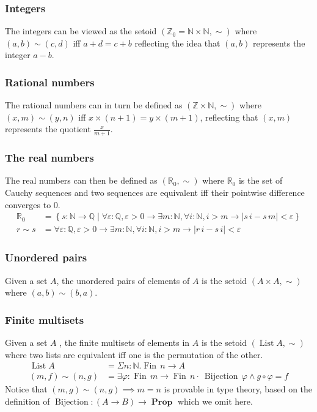 \documentclass[envcountsame]{llncs}
\newcommand{\N}{\mathbb{N}}
\newcommand{\Q}{\mathbb{Q}}
\newcommand{\R}{\mathbb{R}}
\newcommand{\Z}{\mathbb{Z}}
\providecommand{\set}  [1]{\left\{#1\right\}}
\DeclareMathOperator{\Prop}{\mathbf{Prop}}
\DeclareMathOperator{\List}{List}
\DeclareMathOperator{\Fin}{Fin}
\DeclareMathOperator{\Bijection}{Bijection}
\begin{document}
\subsubsection*{Integers}
The integers can be viewed as the setoid $(\Z_0=\N\times\N,\sim)$ where $(a,b)\sim(c,d)$ if{f} $a+d=c+b$ reflecting the idea that $(a,b)$ represents the integer $a-b$.
\subsubsection*{Rational numbers}
The rational numbers can in turn be defined as $(\Z\times\N,\sim)$ where $(x,m)\sim(y,n)$ if{f} $x\times(n+1)=y\times(m+1)$, reflecting that $(x,m)$ represents the quotient $\frac {x}{m+1}$.


\subsubsection*{The real numbers}

The real numbers can then be defined as $(\R_0,\sim)$ where $\R_0$ is the set of Cauchy sequences and two sequences are equivalent if{f} their pointwise difference converges to $0$.
\begin{align*}
\R_0&=\set{s : \N\to\Q \mid \forall\varepsilon :\Q,\varepsilon>0\to\exists m:\N, \forall i:\N, i>m\to |s\,i - s\, m|<\varepsilon}\\
r\sim s &= \forall\varepsilon :\Q,\varepsilon>0\to\exists m:\N, \forall i:\N, i>m\to |r\,i - s\,i|<\varepsilon
\end{align*}

\subsubsection*{Unordered pairs}
Given a set $A$, the unordered pairs of elements of $A$ is the setoid $(A\times A,\sim)$ where
$(a,b)\sim(b,a)$.

\subsubsection*{Finite multisets}
Given a set $A$ , the finite multisets of elements in $A$ is the setoid $(\List A,\sim)$ where two lists are equivalent if{f} one is the permutation of the other.
\begin{align*}
\List A &= \Sigma n:\N.\Fin\,n\to A\\
(m,f)\sim(n,g) &= \exists \varphi : \Fin\,m \to \Fin\,n \cdot\ \Bijection\,\varphi \land g\circ\varphi = f
\end{align*}
Notice that $(m,g)\sim(n,g)\implies m=n$ is provable in type theory, based on the definition of $\Bijection : (A\to B)\to \Prop$ which we omit here.
\end{document}

